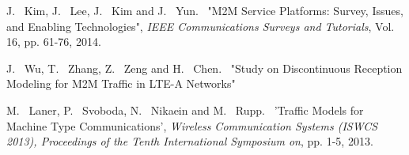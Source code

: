 \documentclass[journal]{IEEEtran}
\begin{document}
%
%
%
\begin{thebibliography}{1}

J. ~Kim, J. ~Lee, J. ~Kim and J. ~Yun. ~"M2M Service Platforms: Survey, Issues, and Enabling Technologies", \emph{IEEE Communications Surveys and Tutorials}, Vol. 16, pp. 61-76, 2014.

J. ~Wu, T. ~Zhang, Z. ~Zeng and H. ~Chen. ~"Study on Discontinuous Reception Modeling for M2M Traffic in LTE-A Networks"

M. ~Laner, P. ~Svoboda, N. ~Nikaein and M. ~Rupp. ~'Traffic Models for Machine Type Communications', \emph{Wireless Communication Systems (ISWCS 2013), Proceedings of the Tenth International Symposium on}, pp. 1-5, 2013.
  
\end{thebibliography}
\end{document}
